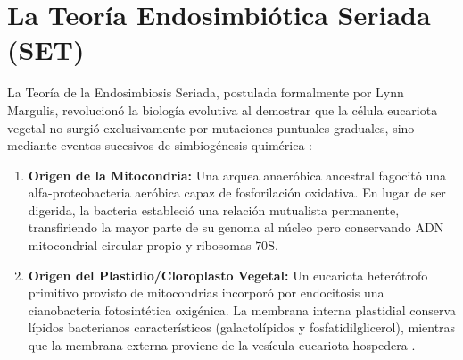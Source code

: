 \documentclass[spanish,letterpaper,oneside]{article}
\begin{document}
\section{La Teoría Endosimbiótica Seriada (SET)}
La Teoría de la Endosimbiosis Seriada, postulada formalmente por Lynn Margulis, revolucionó la biología evolutiva al demostrar que la célula eucariota vegetal no surgió exclusivamente por mutaciones puntuales graduales, sino mediante eventos sucesivos de simbiogénesis quimérica \parencite{alberts2015}:
\begin{enumerate}
    \item \textbf{Origen de la Mitocondria:} Una arquea anaeróbica ancestral fagocitó una alfa-proteobacteria aeróbica capaz de fosforilación oxidativa. En lugar de ser digerida, la bacteria estableció una relación mutualista permanente, transfiriendo la mayor parte de su genoma al núcleo pero conservando ADN mitocondrial circular propio y ribosomas $70\text{S}$.
    \item \textbf{Origen del Plastidio/Cloroplasto Vegetal:} Un eucariota heterótrofo primitivo provisto de mitocondrias incorporó por endocitosis una cianobacteria fotosintética oxigénica. La membrana interna plastidial conserva lípidos bacterianos característicos (galactolípidos y fosfatidilglicerol), mientras que la membrana externa proviene de la vesícula eucariota hospedera \parencite{taiz2015}.
\end{enumerate}
\end{document}
